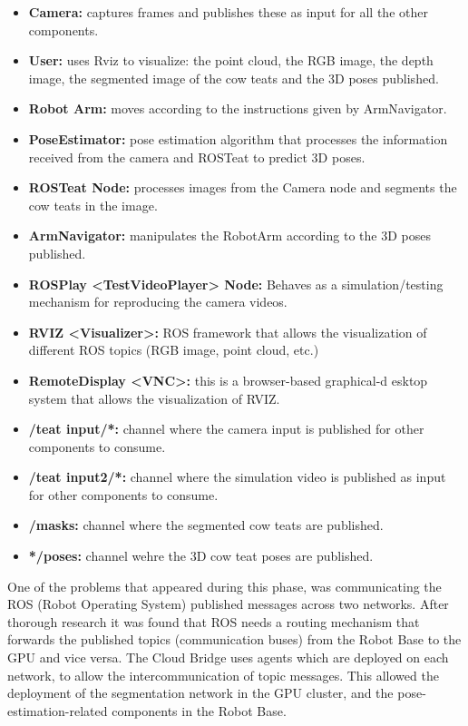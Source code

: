 \begin{itemize}
    \item \textbf{Camera:} captures frames and publishes these as input for all the other components.
    \item \textbf{User:} uses Rviz to visualize: the point cloud, the RGB image, the depth image, the segmented image of the cow teats and the 3D poses published.
    \item \textbf{Robot Arm:} moves according to the instructions given by ArmNavigator. 
    \item \textbf{PoseEstimator:} pose estimation algorithm that processes the information received from the camera and ROSTeat to predict 3D poses.
    \item \textbf{ROSTeat Node:} processes images from the Camera node and segments the cow teats in the image.
    \item \textbf{ArmNavigator:} manipulates the RobotArm according to the 3D poses published.
    \item \textbf{ROSPlay <TestVideoPlayer> Node:} Behaves as a simulation/testing mechanism for reproducing the camera videos.
    \item \textbf{RVIZ <Visualizer>:} ROS framework that allows the visualization of different ROS topics (RGB image, point cloud, etc.)
    \item \textbf{RemoteDisplay <VNC>:} this is a browser-based graphical-d
    esktop system that allows the visualization of RVIZ.
    \item \textbf{/teat input/*:} channel where the camera input is published for other components to consume.
    \item \textbf{/teat input2/*:} channel where the simulation video is published as input for other components to consume.
    \item \textbf{/masks:} channel where the segmented cow teats are published.
    \item \textbf{*/poses:} channel wehre the 3D cow teat poses are published.
\end{itemize}
One of the problems that appeared during this phase, was communicating the ROS (Robot Operating System) published messages across two networks. 
After thorough research it was found that ROS needs a routing mechanism that forwards the published topics (communication buses) from the Robot Base to the GPU and vice versa. The Cloud Bridge uses agents which are deployed on each network, to allow the intercommunication of topic messages. This allowed the deployment of the segmentation network in the GPU cluster, and the pose-estimation-related components in the Robot Base. 

